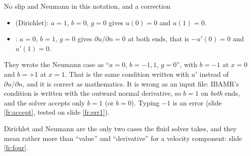\documentclass[aspectratio=169,11pt]{beamer}
\begin{document}
\begin{frame}{No slip and Neumann in this notation, and a correction}
\label{fr:correction}
\small
\begin{itemize}
  \item {} (Dirichlet): $a = 1$, $b = 0$, $g = 0$ gives $u(0) = 0$ and $u(1) = 0$.
  \item {}: $a = 0$, $b = 1$, $g = 0$ gives $\partial u/\partial n = 0$ at both ends, that is $-u'(0) = 0$ and $u'(1) = 0$.
\end{itemize}
\vspace{1mm}
\begin{punchbox}
\small {} They wrote the Neumann case as ``$a = 0$, $b = -1, 1$, $g = 0$'', with $b = -1$ at $x = 0$ and $b = +1$ at $x = 1$. That is the same condition written with $u'$ instead of $\partial u/\partial n$, and it is correct as mathematics. It is wrong as an input file: IBAMR's condition is written with the outward normal derivative, so $b = 1$ on \emph{both} ends, and the solver accepts only $b = 1$ (or $b = 0$). Typing $-1$ is an error (slide \ref{fr:accept}, tested on slide \ref{fr:err1}).
\end{punchbox}
\vspace{1mm}
\small Dirichlet and Neumann are the only two cases the fluid solver takes, and they mean rather more than ``value'' and ``derivative'' for a velocity component: slide \ref{fr:four}.
\end{frame}
\end{document}
